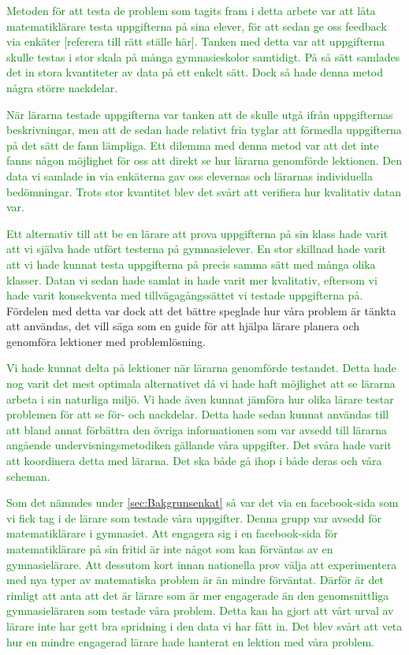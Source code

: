 \textcolor{green}{Metoden för att testa de problem som tagits fram i detta arbete var att låta matematiklärare testa uppgifterna på sina elever, för att sedan ge oss feedback via enkäter [referera till rätt ställe här]. Tanken med detta var att uppgifterna skulle testas i stor skala på många gymnasieskolor samtidigt. På så sätt samlades det in stora kvantiteter av data på ett enkelt sätt. Dock så hade denna metod några större nackdelar.}

\textcolor{green}{När lärarna testade uppgifterna var tanken att de skulle utgå ifrån uppgifternas beskrivningar, men att de sedan hade relativt fria tyglar att förmedla uppgifterna på det sätt de fann lämpliga. Ett dilemma med denna metod var att det inte fanns någon möjlighet för oss att direkt se hur lärarna genomförde lektionen. Den data vi samlade in via enkäterna gav oss elevernas och lärarnas individuella bedömningar. Trots stor kvantitet blev det svårt att verifiera hur kvalitativ datan var.}

\textcolor{green}{Ett alternativ till att be en lärare att prova uppgifterna på sin klass hade varit att vi själva hade utfört testerna på gymnasielever. En stor skillnad hade varit att vi hade kunnat testa uppgifterna på precis samma sätt med många olika klasser. Datan vi sedan hade samlat in hade varit mer kvalitativ, eftersom vi hade varit konsekventa med tillvägagångssättet vi testade uppgifterna på.}
    \textcolor{lila}{Fördelen med detta var dock att det bättre speglade hur våra problem är tänkta att användas, det vill säga som en guide för att hjälpa lärare  planera och genomföra lektioner med problemlösning.}
    
    \textcolor{green}{Vi hade kunnat delta på lektioner när lärarna genomförde testandet. Detta hade nog varit det mest optimala alternativet då vi hade haft möjlighet att se lärarna arbeta i sin naturliga miljö. Vi hade även kunnat jämföra hur olika lärare testar problemen för att se för- och nackdelar. Detta hade sedan kunnat användas till att bland annat förbättra den övriga informationen som var avsedd till lärarna angående undervisningsmetodiken gällande våra uppgifter. Det svåra hade varit att koordinera detta med lärarna. Det ska både gå ihop i både deras och våra scheman.}
    
    \textcolor{green}{Som det nämndes under \ref{sec:Bakgrunsenkat} så var det via en facebook-sida som vi fick tag i de lärare som testade våra uppgifter. Denna grupp var avsedd för matematiklärare i gymnasiet. Att engagera sig i en facebook-sida för matematiklärare på sin fritid är inte något som kan förväntas av en gymnasielärare. Att dessutom kort innan nationella prov välja att experimentera med nya typer av matematiska problem är än mindre förväntat. Därför är det rimligt att anta att det är lärare som är mer engagerade än den genomsnittliga gymnasieläraren som testade våra problem. Detta kan ha gjort att vårt urval av lärare inte har gett bra spridning i den data vi har fått in. Det blev svårt att veta hur en mindre engagerad lärare hade hanterat en lektion med våra problem.}


